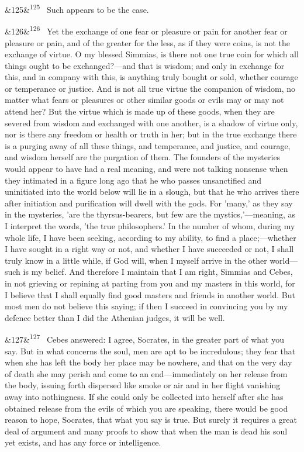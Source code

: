 \documentclass[12pt]{article}
\newcommand{\para}[1][]{\par\noindent\ifx&#1&\else\textsuperscript{\footnotesize #1}~\fi}
\begin{document}
\para[125] Such appears to be the case.

\para[126] Yet the exchange of one fear or pleasure or pain for another fear or pleasure or pain, and of the greater for the less, as if they were coins, is not the exchange of virtue. O my blessed Simmias, is there not one true coin for which all things ought to be exchanged?---and that is wisdom; and only in exchange for this, and in company with this, is anything truly bought or sold, whether courage or temperance or justice. And is not all true virtue the companion of wisdom, no matter what fears or pleasures or other similar goods or evils may or may not attend her? But the virtue which is made up of these goods, when they are severed from wisdom and exchanged with one another, is a shadow of virtue only, nor is there any freedom or health or truth in her; but in the true exchange there is a purging away of all these things, and temperance, and justice, and courage, and wisdom herself are the purgation of them. The founders of the mysteries would appear to have had a real meaning, and were not talking nonsense when they intimated in a figure long ago that he who passes unsanctified and uninitiated into the world below will lie in a slough, but that he who arrives there after initiation and purification will dwell with the gods. For 'many,' as they say in the mysteries, 'are the thyrsus-bearers, but few are the mystics,'---meaning, as I interpret the words, 'the true philosophers.' In the number of whom, during my whole life, I have been seeking, according to my ability, to find a place;---whether I have sought in a right way or not, and whether I have succeeded or not, I shall truly know in a little while, if God will, when I myself arrive in the other world---such is my belief. And therefore I maintain that I am right, Simmias and Cebes, in not grieving or repining at parting from you and my masters in this world, for I believe that I shall equally find good masters and friends in another world. But most men do not believe this saying; if then I succeed in convincing you by my defence better than I did the Athenian judges, it will be well.

\para[127] Cebes answered: I agree, Socrates, in the greater part of what you say. But in what concerns the soul, men are apt to be incredulous; they fear that when she has left the body her place may be nowhere, and that on the very day of death she may perish and come to an end---immediately on her release from the body, issuing forth dispersed like smoke or air and in her flight vanishing away into nothingness. If she could only be collected into herself after she has obtained release from the evils of which you are speaking, there would be good reason to hope, Socrates, that what you say is true. But surely it requires a great deal of argument and many proofs to show that when the man is dead his soul yet exists, and has any force or intelligence.
\end{document}
